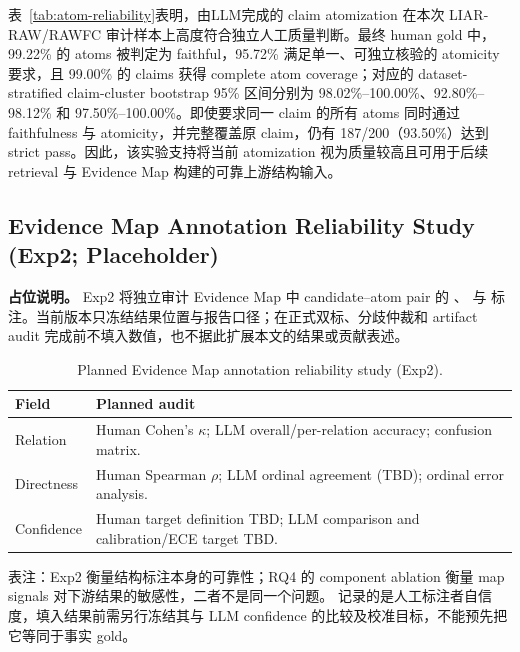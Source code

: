\documentclass[letterpaper]{article}
\begin{document}
表~\ref{tab:atom-reliability}表明，由LLM完成的 claim atomization 在本次 LIAR-RAW/RAWFC 审计样本上高度符合独立人工质量判断。最终 human gold 中，99.22\% 的 atoms 被判定为 faithful，95.72\% 满足单一、可独立核验的 atomicity 要求，且 99.00\% 的 claims 获得 complete atom coverage；对应的 dataset-stratified claim-cluster bootstrap 95\% 区间分别为 98.02\%--100.00\%、92.80\%--98.12\% 和 97.50\%--100.00\%。即使要求同一 claim 的所有 atoms 同时通过 faithfulness 与 atomicity，并完整覆盖原 claim，仍有 187/200（93.50\%）达到 strict pass。因此，该实验支持将当前 atomization 视为质量较高且可用于后续 retrieval 与 Evidence Map 构建的可靠上游结构输入。

\subsection{Evidence Map Annotation Reliability Study (Exp2; Placeholder)}

\textbf{占位说明。} Exp2 将独立审计 Evidence Map 中 candidate--atom pair 的 \texttt{}、\texttt{} 与 \texttt{} 标注。当前版本只冻结结果位置与报告口径；在正式双标、分歧仲裁和 artifact audit 完成前不填入数值，也不据此扩展本文的结果或贡献表述。

\begin{table}[t]
\centering
\scriptsize
\setlength{\tabcolsep}{2.5pt}
\renewcommand{\arraystretch}{1.08}
\caption{Planned Evidence Map annotation reliability study (Exp2).}
\label{tab:map-reliability-placeholder}
\begin{tabularx}{\columnwidth}{@{}l Y@{}}
\toprule
\textbf{Field} & \textbf{Planned audit} \\
\midrule
Relation & Human Cohen's $\kappa$; LLM overall/per-relation accuracy; confusion matrix. \\
Directness & Human Spearman $\rho$; LLM ordinal agreement (TBD); ordinal error analysis. \\
Confidence & Human target definition TBD; LLM comparison and calibration/ECE target TBD. \\
\bottomrule
\end{tabularx}
\end{table}

表注：Exp2 衡量结构标注本身的可靠性；RQ4 的 component ablation 衡量 map signals 对下游结果的敏感性，二者不是同一个问题。\texttt{} 记录的是人工标注者自信度，填入结果前需另行冻结其与 LLM confidence 的比较及校准目标，不能预先把它等同于事实 gold。
\end{document}
